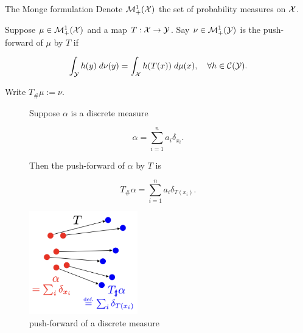 \begin{frame}{The Monge formulation}
    \scriptsize
    Denote $\mathcal{M}_+^1(\mathcal{X})$ the set of probability measures on $\mathcal{X}$.

    \begin{Def}
        Suppose $\mu\in\mathcal{M}_+^1(\mathcal{X})$ and a map $T:\mathcal{X}\to\mathcal{Y}$. 
        Say $\nu\in\mathcal{M}_+^1(\mathcal{Y})$ is the push-forward of $\mu$ by $T$ if

        \vspace{-.8em}
        \begin{equation}
            \int_{\mathcal{Y}} h(y)\;d\nu(y) = \int_{\mathcal{X}} h(T(x))\; d\mu(x),
            \quad \forall h\in\mathcal{C}(\mathcal{Y}).
        \end{equation}

        \vspace{-.5em}
        Write $T_\#\mu := \nu$.
    \end{Def}

    \vspace{-1.3em}
    \begin{figure}
        \captionsetup{font=scriptsize}
        \begin{minipage}[c]{0.5\linewidth}
            \vspace{0pt}
            \begin{Exm}
                Suppose $\alpha$ is a discrete measure

                \vspace{-1em}
                \begin{equation*}
                    \alpha = \sum_{i=1}^n a_i\delta_{x_i}.
                \end{equation*}

                \vspace{-.5em}
                Then the push-forward of $\alpha$ by $T$ is

                \vspace{-1em}
                \begin{equation*}
                    T_\#\alpha = \sum_{i=1}^n a_i\delta_{T(x_i)}.
                \end{equation*}
            \end{Exm}
        \end{minipage}
        \hfill
        \begin{minipage}[c]{0.45\linewidth}
            \vspace{0pt}
            \centering
            \includegraphics[width=0.42\textwidth]{png/push-forward.png}
            \caption{push-forward of a discrete measure}
        \end{minipage}
    \end{figure}


\end{frame}
